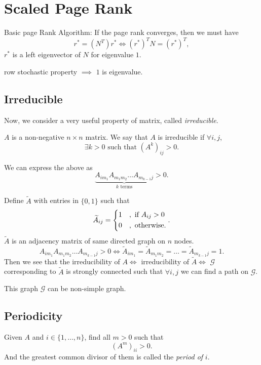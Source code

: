 \chapter{Scaled Page Rank}
\begin{prev}
	Basic page Rank Algorithm: If the page rank converges, then we must have
	\[
		r^{*} = (N^{T})r^{*} \iff (r^{*})^{T} N = (r^{*})^{T},
	\]
	\(r^{*}\) is a left eigenvector of \(N\) for eigenvalue \(1\).
\end{prev}
\begin{remark}
	row stochastic property \(\implies\) \(1\) is eigenvalue.
\end{remark}

\section{Irreducible}
\par Now, we consider a very useful property of matrix, called \emph{irreducible}.
\begin{prev}
	\(A\) is a non-negative \(n\times n\) matrix. We say that \(A\) is irreducible if \(\forall i, j\),
	\[
		\exists k>0 \text{ such that }(A^k)_{ij} > 0.
	\]
\end{prev}
\begin{note}
	We can express the above as
	\[
		\underbrace{A_{im_1} A_{m_{1}m_2} \ldots A_{m_{k-1}j}}_{k\text{ terms}}>0.
	\]
\end{note}
Define \(\widetilde{A}\) with entries in \(\{0, 1\}\) such that
\[
	\widetilde{A}_{ij} = \begin{dcases}
		1 & , \text{ if }A_{ij}>0 \\
		0 & , \text{ otherwise}.
	\end{dcases}.
\]
\(\widetilde{A}\) is an adjacency matrix of same directed graph on \(n\) nodes.
\[
	A_{im_1} A_{m_1 m_2}\ldots A_{m_{k-1} j} > 0 \iff \widetilde{A}_{im_1} = \widetilde{A}_{m_1 m_2} = \ldots = \widetilde{A}_{m_{k-1}j} = 1.
\]
Then we see that the irreducibility of \(A \iff\) irreducibility of \(\widetilde{A}\iff\) \(\mathcal{G}\) corresponding to \(\widetilde{A}\) is strongly connected such that
\(\forall  i, j\) we can find a path on \(\mathcal{G}\).
\begin{remark}
	This graph \(\mathcal{G}\) can be non-simple graph.
\end{remark}

\section{Periodicity}
\begin{definition}[Period]
	Given \(A\) and \(i\in\{1, \ldots , n\}\), find all \(m>0\) such that
	\[
		(A^m)_{ii}>0.
	\]
	And the greatest common divisor of them is called the \emph{period of} \(i\).
\end{definition}

